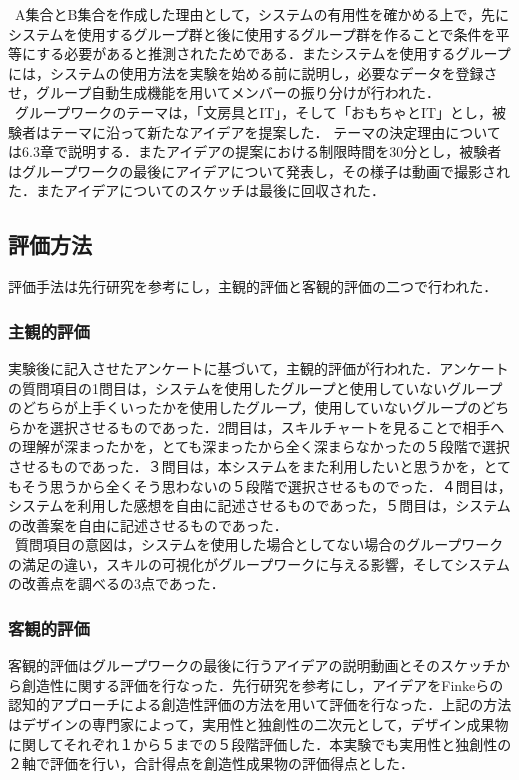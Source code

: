 \documentclass{funthesis}
\begin{document}
\ A集合とB集合を作成した理由として，システムの有用性を確かめる上で，先にシステムを使用するグループ群と後に使用するグループ群を作ることで条件を平等にする必要があると推測されたためである．またシステムを使用するグループには，システムの使用方法を実験を始める前に説明し，必要なデータを登録させ，グループ自動生成機能を用いてメンバーの振り分けが行われた．\\
\ グループワークのテーマは，「文房具とIT」，そして「おもちゃとIT」とし，被験者はテーマに沿って新たなアイデアを提案した．
テーマの決定理由については6.3章で説明する．またアイデアの提案における制限時間を30分とし，被験者はグループワークの最後にアイデアについて発表し，その様子は動画で撮影された．またアイデアについてのスケッチは最後に回収された．

\subsection{評価方法}
評価手法は先行研究\cite{A17}を参考にし，主観的評価と客観的評価の二つで行われた．
\subsubsection{主観的評価}
実験後に記入させたアンケートに基づいて，主観的評価が行われた．アンケートの質問項目の1問目は，システムを使用したグループと使用していないグループのどちらが上手くいったかを使用したグループ，使用していないグループのどちらかを選択させるものであった．2問目は，スキルチャートを見ることで相手への理解が深まったかを，とても深まったから全く深まらなかったの５段階で選択させるものであった．３問目は，本システムをまた利用したいと思うかを，とてもそう思うから全くそう思わないの５段階で選択させるものでった．４問目は，システムを利用した感想を自由に記述させるものであった，５問目は，システムの改善案を自由に記述させるものであった．\\
\ 質問項目の意図は，システムを使用した場合としてない場合のグループワークの満足の違い，スキルの可視化がグループワークに与える影響，そしてシステムの改善点を調べるの3点であった．　　　　　　　　　　　　　　　　　　　　　　　　　　　　　　　　　　　　　　　　　　　　　　　　　　　　　　　　
\subsubsection{客観的評価}
客観的評価はグループワークの最後に行うアイデアの説明動画とそのスケッチから創造性に関する評価を行なった．先行研究\cite{A18}を参考にし，アイデアをFinkeら\cite{A19}の認知的アプローチによる創造性評価の方法を用いて評価を行なった．上記の方法はデザインの専門家によって，実用性と独創性の二次元として，デザイン成果物に関してそれぞれ１から５までの５段階評価した．本実験でも実用性と独創性の２軸で評価を行い，合計得点を創造性成果物の評価得点とした．
\end{document}
